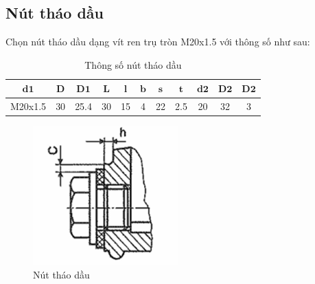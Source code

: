 \subsection{Nút tháo dầu}
Chọn nút tháo dầu dạng vít ren trụ tròn M20x1.5 với thông số như sau:
\begin{table}[H]
    \centering
    \begin{tabular}{|c|c|c|c|c|c|c|c|c|c|c|}
    \hline
    $\mathbf{d1}$ & $\mathbf{D}$ & $\mathbf{D1}$ & $\mathbf{L}$ & $\mathbf{l}$ & $\mathbf{b}$ & $\mathbf{s}$ & $\mathbf{t}$ & $\mathbf{d2}$ & $\mathbf{D2}$ & $\mathbf{D2}$ \\
    \hline
    M20x1.5 & 30 & 25.4 & 30 & 15 & 4 & 22 & 2.5 & 20 & 32 & 3 \\
    \hline
    \end{tabular}
    \caption{Thông số nút tháo dầu}
\end{table}
\begin{figure}[H]
    \centering
    \includegraphics[width=0.5\textwidth]{pictures/nut.png}
    \caption{Nút tháo dầu}
\end{figure}

